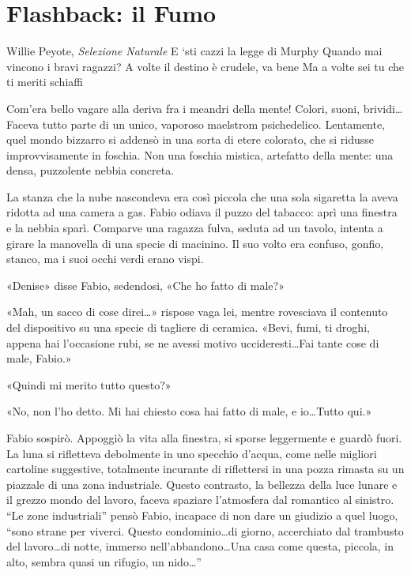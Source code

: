 \chapter{Flashback: il Fumo}

\begin{chapquote}{Willie Peyote, \textit{Selezione Naturale}}
	E `sti cazzi la legge di Murphy\newline
	Quando mai vincono i bravi ragazzi?\newline
	A volte il destino è crudele, va bene\newline
	Ma a volte sei tu che ti meriti schiaffi
\end{chapquote}



Com'era bello vagare alla deriva fra i meandri della mente! Colori, suoni, brividi\ldots \space Faceva tutto parte di un unico, vaporoso maelstrom psichedelico. Lentamente, quel mondo bizzarro si addensò in una sorta di etere colorato, che si ridusse improvvisamente in foschia. Non una foschia mistica, artefatto della mente: una densa, puzzolente nebbia concreta.

La stanza che la nube nascondeva era così piccola che una sola sigaretta la aveva ridotta ad una camera a gas. Fabio odiava il puzzo del tabacco: aprì una finestra e la nebbia sparì. Comparve una ragazza fulva, seduta ad un tavolo, intenta a girare la manovella di una specie di macinino. Il suo volto era confuso, gonfio, stanco, ma i suoi occhi verdi erano vispi.

«Denise» disse Fabio, sedendosi, «Che ho fatto di male?»

«Mah, un sacco di cose direi\ldots» rispose vaga lei, mentre rovesciava il contenuto del dispositivo su una specie di tagliere di ceramica. «Bevi, fumi, ti droghi, appena hai l'occasione rubi, se ne avessi motivo uccideresti\ldots Fai tante cose di male, Fabio.»

«Quindi mi merito tutto questo?»

«No, non l'ho detto. Mi hai chiesto cosa hai fatto di male, e io\ldots Tutto qui.»

Fabio sospirò. Appoggiò la vita alla finestra, si sporse leggermente e guardò fuori. La luna si rifletteva debolmente in uno specchio d'acqua, come nelle migliori cartoline suggestive, totalmente incurante di riflettersi in una pozza rimasta su un piazzale di una zona industriale. Questo contrasto, la bellezza della luce lunare e il grezzo mondo del lavoro, faceva spaziare l'atmosfera dal romantico al sinistro. ``Le zone industriali'' pensò Fabio, incapace di non dare un giudizio a quel luogo, ``sono strane per viverci. Questo condominio\ldots di giorno, accerchiato dal trambusto del lavoro\ldots di notte, immerso nell'abbandono\ldots Una casa come questa, piccola, in alto, sembra quasi un rifugio, un nido\ldots''

